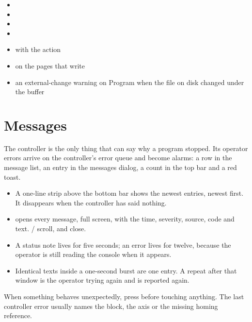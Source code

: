\begin{itemize}
  \item {}
  \item {}
  \item {}
  \item {}
  \item {} with the  action
  \item {} on the pages that write
  \item an external-change warning on Program when the file on disk changed under the
        buffer
\end{itemize}

\section{Messages}

The controller is the only thing that can say why a program stopped. Its operator errors
arrive on the controller's error queue and become alarms: a row in the message list, an entry
in the messages dialog, a count in the top bar and a red toast.

\begin{itemize}
  \item A one-line strip above the bottom bar shows the newest entries, newest first. It
        disappears when the controller has said nothing.
  \item {} opens every message, full screen, with the time, severity, source, code
        and text. / scroll,  and  close.
  \item A status note lives for five seconds; an error lives for twelve, because the operator
        is still reading the console when it appears.
  \item Identical texts inside a one-second burst are one entry. A repeat after that window
        is the operator trying again and is reported again.
\end{itemize}

\begin{tipbox}
  When something behaves unexpectedly, press  before touching anything. The last
  controller error usually names the block, the axis or the missing homing reference.
\end{tipbox}

